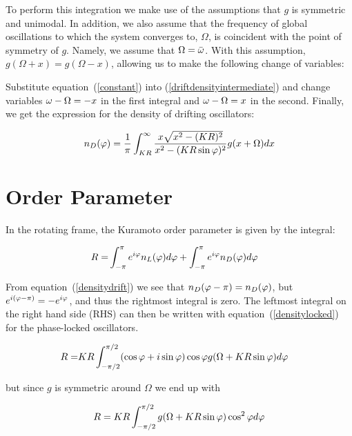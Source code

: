 To perform this integration we make use of the assumptions that $g$ is symmetric and unimodal. In addition, we also assume that the
frequency of global oscillations to which the system converges to, $\Omega$, is coincident with the point of symmetry of $g$. Namely,
we assume that $\Omega = \bar{\omega}$. With this assumption, $g(\Omega + x) = g(\Omega - x)$, allowing us to make the following change
of variables:

Substitute equation~(\ref{constant}) into (\ref{driftdensityintermediate}) and change variables $\omega -
\Omega = -x$ in the first integral and $\omega - \Omega = x$ in the second. Finally, we get the expression for the density of drifting
oscillators:

\begin{align}
    n_D(\varphi) = \frac{1}{\pi}\int_{K R}^\infty \frac{x\sqrt{x^2 - (K R)^2}}{x^2 - (K R\sin\varphi)^2}g(x+\Omega)dx
    \label{densitydrift}
\end{align}


\section{Order Parameter}


In the rotating frame, the Kuramoto order parameter is given by the integral:

\begin{align}
    R = &\int_{-\pi}^{\pi} e^{i\varphi}n_L(\varphi)d\varphi + \int_{-\pi}^{\pi} e^{i\varphi}n_D(\varphi)d\varphi
\end{align}

From equation~(\ref{densitydrift}) we see that $n_D(\varphi - \pi) = n_D(\varphi)$, but $e^{i(\varphi - \pi)} = -e^{i\varphi}$,
and thus the rightmost integral is zero. The leftmost integral on the right hand side (RHS) can then be written with
equation~(\ref{densitylocked}) for the phase-locked oscillators.

\begin{align}
     R = &K R\int_{-\pi/2}^{\pi/2} (\cos \varphi + i \sin \varphi ) \cos\varphi g(\Omega + K R \sin\varphi) d\varphi
\end{align}

\noindent but since $g$ is symmetric around $\Omega$ we end up with

\begin{align}
     R = K R\int_{-\pi/2}^{\pi/2} g(\Omega + K R \sin\varphi) \cos^2\varphi d\varphi
     \label{finalkura}
\end{align}

